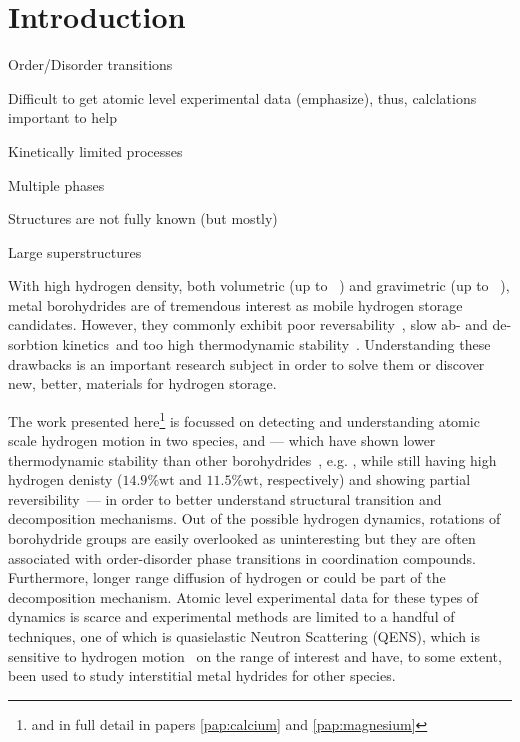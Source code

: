 \section{Introduction}
\label{sec:borohydrides-introduction}

\bit
\item Order/Disorder transitions
\item Difficult to get atomic level experimental data (emphasize), thus, calclations important to help
\item Kinetically limited processes
\item Multiple phases
\item Structures are not fully known (but mostly)
\item Large superstructures
\eit

With high hydrogen density, both volumetric (up to \missing{}~\citemiss) and gravimetric (up to \missing{}~\citemiss), metal borohydrides are of tremendous interest as mobile hydrogen storage candidates.
However, they commonly exhibit poor reversability~\citemiss, slow ab- and de-sorbtion kinetics~\citemiss and too high thermodynamic stability~\citemiss.
Understanding these drawbacks is an important research subject in order to solve them or discover new, better, materials for hydrogen storage.

The work presented here\footnote{and in full detail in papers \ref{pap:calcium} and \ref{pap:magnesium}} is focussed on detecting and understanding atomic scale hydrogen motion in two species,  and  --- which have shown lower thermodynamic stability than other borohydrides~\cite{borohydride-stability-2006, calcium-stability-2006}, e.g. , while still having high hydrogen denisty ($14.9\%\text{wt}$ and $11.5\%\text{wt}$, respectively) and showing partial reversibility~\citemiss --- in order to better understand structural transition and decomposition mechanisms.
Out of the possible hydrogen dynamics, rotations of borohydride groups are easily overlooked as uninteresting but they are often associated with order-disorder phase transitions in coordination compounds.~\cite{order-disorder-2006, order-disorder-2010}
Furthermore, longer range diffusion of hydrogen or  could be part of the decomposition mechanism.
Atomic level experimental data for these types of dynamics is scarce and experimental methods are limited to a handful of techniques, one of which is quasielastic Neutron Scattering (QENS), which is sensitive to hydrogen motion~\cite{qens-bee-1988} on the range of interest and have, to some extent, been used to study interstitial metal hydrides for other species.~\citemiss

